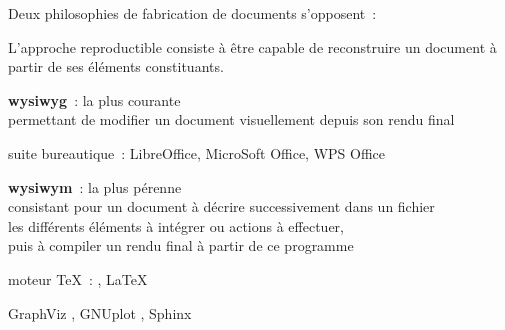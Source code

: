 Deux philosophies de fabrication de documents s’opposent :

L’approche reproductible consiste à être capable de reconstruire un document
à partir de ses éléments constituants.

\begin{itmz}
\item{\textbf{\gls{wysiwyg}} : la plus courante\\
permettant de modifier un document visuellement depuis son rendu final
    \begin{itmz}
    \item{suite bureautique : LibreOffice, MicroSoft Office, WPS Office}
    \end{itmz}
}
\item{\textbf{\gls{wysiwym}} : la plus pérenne\\
consistant pour un document à décrire successivement dans un fichier\\
les différents éléments à intégrer ou actions à effectuer,\\
puis à compiler un rendu final à partir de ce programme
    \begin{itmz}
    \item{moteur \TeX : \XeLaTeX, \LaTeX \cite{latex}}
    \item{GraphViz \cite{graphviz}, GNUplot \cite{gnuplot}, Sphinx \cite{sphinx}}
    \end{itmz}
}
\end{itmz}

\pagebreak
